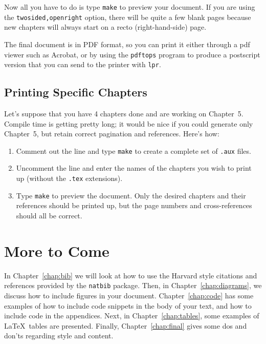 Now all you have to do is type {\tt make} to preview your document.
If you are using the {\tt twosided,openright} option,
there will be quite a few blank pages because new chapters will always
start on a recto (right-hand-side) page.

The final document is in PDF format, so you can print it either
through a pdf viewer such as Acrobat, or by using the \verb|pdftops|
program to produce a postscript version that you can send to the
printer with \verb|lpr|.

\subsection{Printing Specific Chapters}
Let's suppose that you have 4 chapters done and are working on
Chapter~5.  Compile time is getting pretty long; it would be nice if
you could generate only Chapter~5, but retain correct pagination and
references.  Here's how:
\begin{enumerate}
\item Comment out the \verb|| line and type {\tt make} to
create a complete set of {\tt .aux} files.
\item Uncomment the \verb|| line and enter the names of
the chapter{s} you wish to print up (without the {\tt .tex} extensions).
\item Type {\tt make} to preview the document.  Only the
desired chapters and their references should be printed up, but the
page numbers and cross-references should all be correct.
\end{enumerate}

\section{More to Come}
In Chapter~\ref{chap:bib} we will look at how to use the Harvard style
citations and references provided by the {\tt natbib} package.
Then, in Chapter~\ref{chap:diagrams}, we discuss how to include
figures in your document.
Chapter~\ref{chap:code} has some examples of how to include code
snippets in the body of your text, and how to include code in the
appendices. Next, in Chapter~\ref{chap:tables}, some examples of
\LaTeX\ tables are presented.  Finally, Chapter~\ref{chap:final}
gives some dos and don'ts regarding style and content.
